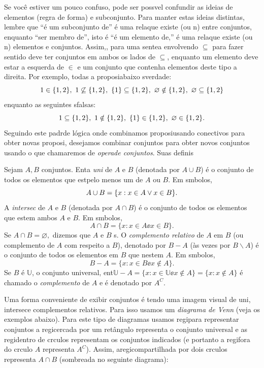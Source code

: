 Se voc\^e estiver um pouco confuso, pode ser poss\ih vel confundir as ideias de elementos (regra de forma\caoi) e subconjunto. Para manter estas ideias distintas, lembre que ``\'e um subconjunto de'' \'e uma rela\cao que existe (ou n\aoi) entre conjuntos, enquanto ``ser membro de'', isto \'e ``\'e um elemento de,'' \'e uma rela\cao que existe (ou n\aoi) elementos e conjuntos. Assim,, para uma sente\cc a envolvendo $\subseteq$ para fazer sentido deve ter conjuntos em ambos os lados de $\subseteq$, enquanto um elemento deve estar a esquerda de $\in$ e um conjunto que contenha elementos deste tipo a direita. Por exemplo, todas a proposi\coes abaixo s\ao verdade:
\[
1\in\{1,2\},\textrm{ } 1\not\subseteq\{1,2\},\textrm{ } \{1\}\subseteq\{1,2\},\textrm{ } \varnothing\notin\{1,2\},\textrm{ } \varnothing\subseteq\{1,2\}  
\]  
enquanto as seguintes s\ao falsas:
\[
1\subseteq\{1,2\},\textrm{ } 1\notin\{1,2\},\textrm{ } \{1\}\in\{1,2\},\textrm{ } \varnothing\in \{1,2\}.
\]
Seguindo este padr\ao de l\'ogica onde combinamos proposi\coes usando conectivos para obter novas proposi\cois, desejamos combinar conjuntos para obter novos conjuntos usando o que chamaremos de {\it opera\coes de conjuntos}. Suas defini\coes s\ao

\begin{definb}
Sejam $A,B$ conjuntos. Ent\ao a {\it uni\ao} de $A$ e $B$ (denotada por $A\cup B$) \'e o conjunto de todos os elementos que est\ao pelo menos um de $A$ ou $B$. Em s\ih mbolos, 
\[
A \cup B = \{x:x\in A \vee x\in B\}. 
\]
A {\it intersec\cao} de $A$ e $B$ (denotada por $A\cap B$) \'e o conjunto de todos os elementos que est\ao em ambos $A$ e $B$. Em s\ih mbolos, 
\[
A \cap B = \{x:x\in A \ee x\in B\}. 
\]
Se $A\cap B=\varnothing,$ dizemos que $A$ e $B$ s. O {\it complemento relativo} de $A$ em $B$ (ou complemento de $A$ com respeito a $B$), denotado por $B-A$ (\`as vezes por $B \backslash A$) \'e o conjunto de todos os elementos em $B$ que n\ao est\ao em $A$. Em s\ih mbolos,
\[
B-A = \{x:x\in B \ee x\notin A\}. 
\]
Se $B$ \'e $\mathbb{U}$, o conjunto universal, ent\ao $\mathbb{U}-A = \{x:x\in \mathbb{U} \ee x\notin A\}=\{x:x\notin A\}$ \'e chamado o {\it complemento} de $A$ e \'e denotado por $A^{C}$.
\end{definb}

Uma forma conveniente de exibir conjuntos \'e tendo uma imagem visual de uni\ois, intersec\coes e complementos relativos. Para isso usamos um {\it diagrama de Venn} (veja os exemplos abaixo). Para este tipo de diagramas usamos regi\oes para representar conjuntos a regi\ao cercada por um ret\^angulo representa o conjunto universal e as regi\oes dentro de c\ih rculos representam os conjuntos indicados (e portanto a regi\ao fora do c\ih rculo $A$ representa $A^C$). Assim, aregi\ao compartilhada por dois c\ih rculos representa $A\cap B$ (sombreada no seguinte diagrama):

